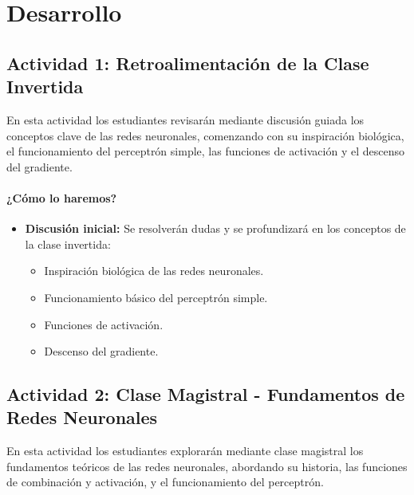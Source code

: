 \documentclass[a4,11pt]{aleph-notas}
\begin{document}
\section*{Desarrollo}

\subsection*{Actividad 1: Retroalimentación de la Clase Invertida}

En esta actividad los estudiantes revisarán mediante discusión guiada los conceptos clave de las redes neuronales, comenzando con su inspiración biológica, el funcionamiento del perceptrón simple, las funciones de activación y el descenso del gradiente.

\paragraph{¿Cómo lo haremos?}  
\begin{itemize}[leftmargin=*]
    \item \textbf{Discusión inicial:}
    Se resolverán dudas y se profundizará en los conceptos de la clase invertida:
    \begin{itemize}
        \item Inspiración biológica de las redes neuronales.
        \item Funcionamiento básico del perceptrón simple.
        \item Funciones de activación.
        \item Descenso del gradiente.
    \end{itemize}
   
\end{itemize}

\subsection*{Actividad 2: Clase Magistral - Fundamentos de Redes Neuronales}

En esta actividad los estudiantes explorarán mediante clase magistral los fundamentos teóricos de las redes neuronales, abordando su historia, las funciones de combinación y activación, y el funcionamiento del perceptrón.
\end{document}
